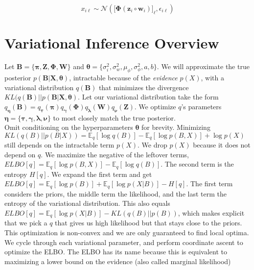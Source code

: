 \documentclass[11pt]{article}
\theoremstyle{definition}
\theoremstyle{plain}
\newcommand{\E}{\mathbb{E}}
\begin{document}
$$ x_{i\ell} \sim \mathcal{N}(\big[ \mathbf{\Phi}(\mathbf{z}_i \circ \mathbf{w}_i) \big]_\ell, \epsilon_{i\ell}) $$

\section{Variational Inference Overview}

\noindent Let $\mathbf{B} = \{\boldsymbol{\pi}, \mathbf{Z}, \mathbf{\Phi}, \mathbf{W}\}$ and 
$\boldsymbol{\theta} = \{\sigma^2_i, \sigma^2_w, \mu_{\phi}, \sigma^2_\phi, a, b \}$. 
We will approximate the true posterior $p(\mathbf{B}|\mathbf{X},\boldsymbol{\theta})$, intractable because of the \textit{evidence} $p(X)$,
with a variational distribution $q(\mathbf{B})$ that minimizes the divergence $KL(q(\mathbf{B}) || p(\mathbf{B}|\mathbf{X},\boldsymbol{\theta})$. 
Let our variational distribution take the form $q_{\boldsymbol{\eta}}(\mathbf{B}) = q_{\boldsymbol{\tau}}(\boldsymbol{\pi}) q_{\boldsymbol{\gamma}}(\boldsymbol{\Phi}) 
q_{\boldsymbol{\lambda}}(\mathbf{W}) q_{\boldsymbol{\nu}}(\mathbf{Z})$. We optimize $q$'s parameters $\boldsymbol{\eta} = \{\boldsymbol{\tau}, \boldsymbol{\gamma}, 
\boldsymbol{\lambda}, \boldsymbol{\nu}\}$ to most closely match the true posterior.\\

\noindent Omit conditioning on the hyperparameters $\boldsymbol{\theta}$ for brevity.
Minimizing $KL(q(B)||p(B|X)) = \E_q[\log q(B)] - \E_q[\log p(B,X)] + \log p(X)$ still depends on the intractable term $p(X)$. We drop $p(X)$ because
it does not depend on $q$. We maximize the negative of the leftover terms, $ELBO[q] = \E_q[\log p(B,X)] - \E_q[\log q(B)]$. The second term is the entropy $H[q]$.
We expand the first term and get $ELBO[q] = \E_q[\log p(B)] + \E_q[\log p(X|B)] - H[q]$. The first term considers the priors, the middle term the likelihood, and the last term
the entropy of the variational distribution. This also equals $ELBO[q] = \E_q[\log p(X|B)] - KL(q(B) || p(B))$, which makes explicit that we pick a $q$ that gives us high likelihood
but that stays close to the priors. This optimization is non-convex and we are only guaranteed to find local optima. We cycle through each variational parameter, and perform coordinate ascent 
to optimize the ELBO. The ELBO has its name because this is equivalent to maximizing a lower bound on the evidence (also called marginal likelihood)\\
\end{document}
